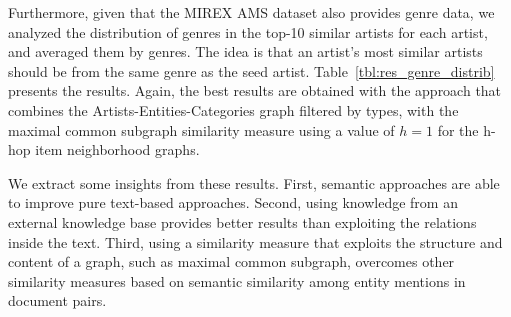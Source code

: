 Furthermore, given that the MIREX AMS dataset also provides genre data, we analyzed the distribution of genres in the top-10 similar artists for each artist, and averaged them by genres. The idea is that an artist's most similar artists should be from the same genre as the seed artist.
Table~\ref{tbl:res_genre_distrib} presents the results. Again, the best results are obtained with the approach that combines the Artists-Entities-Categories graph filtered by types, with the maximal common subgraph similarity measure using a value of $h=1$ for the h-hop item neighborhood graphs.

We extract some insights from these results. First, semantic approaches are able to improve pure text-based approaches. Second, using knowledge from an external knowledge base provides better results than exploiting the relations inside the text. Third, using a similarity measure that exploits the structure and content of a graph, such as maximal common subgraph, overcomes other similarity measures based on semantic similarity among entity mentions in document pairs.





